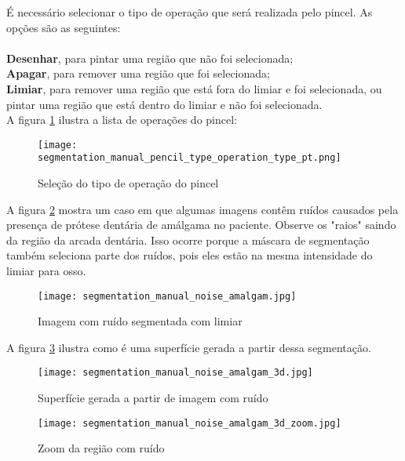 É necessário selecionar o tipo de operação que será realizada pelo pincel. As opções são as
seguintes:\\
\\
\textbf{Desenhar}, para pintar uma região que não foi selecionada;\\
\textbf{Apagar}, para remover uma região que foi selecionada;\\
\textbf{Limiar}, para remover uma região que está fora do limiar e foi selecionada, ou pintar
uma região que está dentro do limiar e não foi selecionada.\\

A figura \ref{fig:select_brush_operations} ilustra a lista de operações do pincel:

\begin{figure}[!htb]
\centering
\texttt{[image: segmentation\_manual\_pencil\_type\_operation\_type\_pt.png]}
\caption{Seleção do tipo de operação do pincel}
\label{fig:select_brush_operations}
\end{figure}

A figura \ref{fig:noise_amalgaman} mostra um caso em que algumas imagens contêm ruídos
causados pela presença de prótese dentária de amálgama no paciente. Observe os "raios" 
saindo da região da arcada dentária. Isso ocorre porque a máscara de segmentação também
seleciona parte dos ruídos, pois eles estão na mesma intensidade do limiar para osso.

\begin{figure}[!htb]
\centering
\texttt{[image: segmentation\_manual\_noise\_amalgam.jpg]}
\caption{Imagem com ruído segmentada com limiar}
\label{fig:noise_amalgaman}
\end{figure}

A figura \ref{fig:surface_amagaman} ilustra como é uma superfície gerada a partir dessa
segmentação.

\begin{figure}[!htb]
\centering
\texttt{[image: segmentation\_manual\_noise\_amalgam\_3d.jpg]}
\caption{Superfície gerada a partir de imagem com ruído}
\label{fig:surface_amagaman}
\end{figure}

\begin{figure}[!htb]
\centering
\texttt{[image: segmentation\_manual\_noise\_amalgam\_3d\_zoom.jpg]}
\caption{Zoom da região com ruído}
\label{fig:surface_amagaman_zoom}
\end{figure}

\newpage

